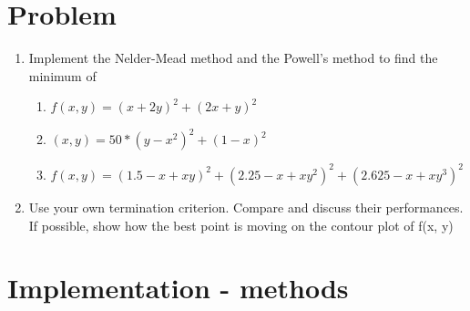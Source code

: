 \documentclass[12pt,letterpaper]{article}
\begin{document}
\section*{Problem}

\begin{enumerate}
  \item Implement the Nelder-Mead method and the Powell's method to find the minimum of
  \begin{enumerate}
    \item $f(x, y)=(x+2y)^2 + (2x+y)^2$
    \item $(x, y)=50*(y-x^2)^2 + (1-x)^2$
    \item $f(x, y)=(1.5-x+xy)^2 + (2.25-x+xy^2)^2 + (2.625 - x+ xy^3)^2$
  \end{enumerate}
  \item Use your own termination criterion. Compare and discuss their performances. 
  If possible, show how the best point is moving on the contour plot of f(x, y)
\end{enumerate}

\section*{Implementation - methods}
\end{document}
